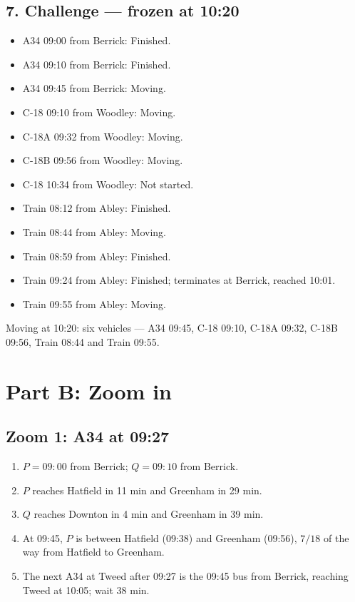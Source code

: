\documentclass[11pt,a4paper]{article}
\begin{document}
\subsection*{7. Challenge --- frozen at 10:20}
\begin{itemize}[leftmargin=*]
\item A34 09:00 from Berrick: Finished.
\item A34 09:10 from Berrick: Finished.
\item A34 09:45 from Berrick: Moving.
\item C-18 09:10 from Woodley: Moving.
\item C-18A 09:32 from Woodley: Moving.
\item C-18B 09:56 from Woodley: Moving.
\item C-18 10:34 from Woodley: Not started.
\item Train 08:12 from Abley: Finished.
\item Train 08:44 from Abley: Moving.
\item Train 08:59 from Abley: Finished.
\item Train 09:24 from Abley: Finished; terminates at Berrick, reached 10:01.
\item Train 09:55 from Abley: Moving.
\end{itemize}
Moving at 10:20: six vehicles --- A34 09:45, C-18 09:10, C-18A 09:32, C-18B 09:56, Train 08:44 and Train 09:55.

\section*{Part B: Zoom in}

\subsection*{Zoom 1: A34 at 09:27}
\begin{enumerate}[label=\textbf{\alph*)},leftmargin=*]
\item \(P=09{:}00\) from Berrick; \(Q=09{:}10\) from Berrick.
\item \(P\) reaches Hatfield in 11 min and Greenham in 29 min.
\item \(Q\) reaches Downton in 4 min and Greenham in 39 min.
\item At 09:45, \(P\) is between Hatfield (09:38) and Greenham (09:56), \(7/18\) of the way from Hatfield to Greenham.
\item The next A34 at Tweed after 09:27 is the 09:45 bus from Berrick, reaching Tweed at 10:05; wait 38 min.
\end{enumerate}
\end{document}
